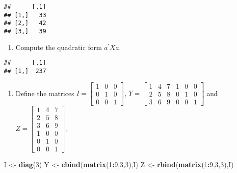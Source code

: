 \documentclass[]{article}
\newenvironment{Shaded}{\begin{snugshade}}{\end{snugshade}}
\newcommand{\KeywordTok}[1]{\textcolor[rgb]{0.13,0.29,0.53}{\textbf{#1}}}
\newcommand{\DecValTok}[1]{\textcolor[rgb]{0.00,0.00,0.81}{#1}}
\newcommand{\StringTok}[1]{\textcolor[rgb]{0.31,0.60,0.02}{#1}}
\newcommand{\OperatorTok}[1]{\textcolor[rgb]{0.81,0.36,0.00}{\textbf{#1}}}
\newcommand{\NormalTok}[1]{#1}
\providecommand{\tightlist}{%
  \setlength{\itemsep}{0pt}\setlength{\parskip}{0pt}}
\begin{document}
\begin{verbatim}
##      [,1]
## [1,]   33
## [2,]   42
## [3,]   39
\end{verbatim}

\begin{enumerate}
\def\labelenumi{\arabic{enumi}.}
\setcounter{enumi}{5}
\tightlist
\item
  Compute the quadratic form \(a^{\prime }Xa\).
\end{enumerate}

\begin{Shaded}
\end{Shaded}

\begin{verbatim}
##      [,1]
## [1,]  237
\end{verbatim}

\begin{enumerate}
\def\labelenumi{\arabic{enumi}.}
\setcounter{enumi}{6}
\tightlist
\item
  Define the matrices
  \(I=\left[ \begin{array}{lll} 1 & 0 & 0 \\ 0 & 1 & 0 \\ 0 & 0 & 1 \end{array} \right]\),
  \(Y=\left[ \begin{array}{lll} 1 & 4 & 7 \\ 2 & 5 & 8 \\ 3 & 6 & 9 \end{array} \begin{array}{lll} 1 & 0 & 0 \\ 0 & 1 & 0 \\ 0 & 0 & 1 \end{array} \right]\)
  and
  \(Z=\left[ \begin{array}{lll} 1 & 4 & 7 \\ 2 & 5 & 8 \\ 3 & 6 & 9 \\ 1 & 0 & 0 \\ 0 & 1 & 0 \\ 0 & 0 & 1 \end{array} \right]\).
\end{enumerate}

\begin{Shaded}
\begin{Highlighting}[]
\NormalTok{I <-}\StringTok{ }\KeywordTok{diag}\NormalTok{(}\DecValTok{3}\NormalTok{)}
\NormalTok{Y <-}\StringTok{ }\KeywordTok{cbind}\NormalTok{(}\KeywordTok{matrix}\NormalTok{(}\DecValTok{1}\OperatorTok{:}\DecValTok{9}\NormalTok{,}\DecValTok{3}\NormalTok{,}\DecValTok{3}\NormalTok{),I)}
\NormalTok{Z <-}\StringTok{ }\KeywordTok{rbind}\NormalTok{(}\KeywordTok{matrix}\NormalTok{(}\DecValTok{1}\OperatorTok{:}\DecValTok{9}\NormalTok{,}\DecValTok{3}\NormalTok{,}\DecValTok{3}\NormalTok{),I)}
\end{Highlighting}
\end{Shaded}
\end{document}
